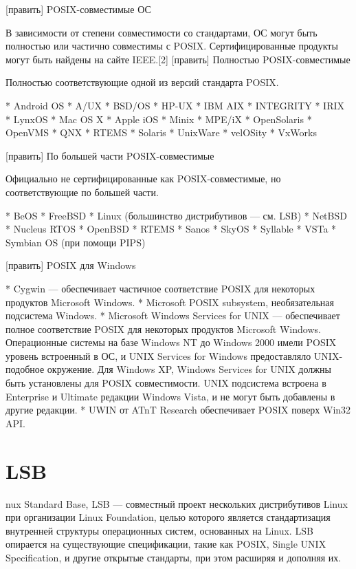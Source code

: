 [править] POSIX-совместимые ОС

В зависимости от степени совместимости со стандартами, ОС могут быть полностью или частично совместимы с POSIX. Сертифицированные продукты могут быть найдены на сайте IEEE.[2]
[править] Полностью POSIX-совместимые

Полностью соответствующие одной из версий стандарта POSIX.

    * Android OS
    * A/UX
    * BSD/OS
    * HP-UX
    * IBM AIX
    * INTEGRITY
    * IRIX
    * LynxOS
    * Mac OS X
    * Apple iOS
    * Minix
    * MPE/iX
    * OpenSolaris
    * OpenVMS
    * QNX
    * RTEMS
    * Solaris
    * UnixWare
    * velOSity
    * VxWorks

[править] По большей части POSIX-совместимые

Официально не сертифицированные как POSIX-совместимые, но соответствующие по большей части.

    * BeOS
    * FreeBSD
    * Linux (большинство дистрибутивов — см. LSB)
    * NetBSD
    * Nucleus RTOS
    * OpenBSD
    * RTEMS
    * Sanos
    * SkyOS
    * Syllable
    * VSTa
    * Symbian OS (при помощи PIPS)

[править] POSIX для Windows

    * Cygwin — обеспечивает частичное соответствие POSIX для некоторых продуктов Microsoft Windows.
    * Microsoft POSIX subsystem, необязательная подсистема Windows.
    * Microsoft Windows Services for UNIX — обеспечивает полное соответствие POSIX для некоторых продуктов Microsoft Windows. Операционные системы на базе Windows NT до Windows 2000 имели POSIX уровень встроенный в ОС, и UNIX Services for Windows предоставляло UNIX-подобное окружение. Для Windows XP, Windows Services for UNIX должны быть установлены для POSIX совместимости. UNIX подсистема встроена в Enterprise и Ultimate редакции Windows Vista, и не могут быть добавлены в другие редакции.
    * UWIN от ATnT Research обеспечивает POSIX поверх Win32 API.

\section{LSB}
nux Standard Base, LSB — совместный проект нескольких дистрибутивов Linux при организации Linux Foundation, целью которого является стандартизация внутренней структуры операционных систем, основанных на Linux. LSB опирается на существующие спецификации, такие как POSIX, Single UNIX Specification, и другие открытые стандарты, при этом расширяя и дополняя их.

